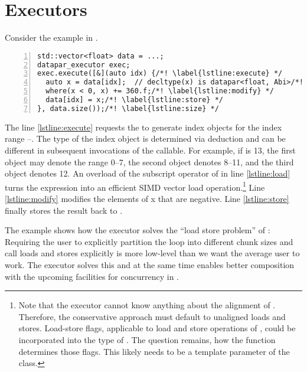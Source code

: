 \section{Executors}

Consider the example in .
\begin{lstlisting}[style=Vc,numbers=left,float,label=lst:executor example,caption={
  Example use of the \type{datapar_executor}.
}]
std::vector<float> data = ...;
datapar_executor exec;
exec.execute([&](auto idx) {/*! \label{lstline:execute} */
  auto x = data[idx];  // decltype(x) is datapar<float, Abi>/*! \label{lstline:load} */
  where(x < 0, x) += 360.f;/*! \label{lstline:modify} */
  data[idx] = x;/*! \label{lstline:store} */
}, data.size());/*! \label{lstline:size} */
\end{lstlisting}
The line \ref{lstline:execute} requests the  to generate index objects for the index range --.
The type of the index object is determined via deduction and can be different in subsequent invocations of the callable.
For example, if  is 13, the first  object may denote the range 0--7, the second  object denotes 8--11, and the third  object denotes 12.
An overload of the subscript operator of \std{} in line \ref{lstline:load} turns the expression into an efficient SIMD vector load operation.\footnote{
  Note that the executor cannot know anything about the alignment of .
  Therefore, the conservative approach must default to unaligned loads and stores.
  Load-store flags, applicable to load and store operations of \datapar, could be incorporated into the type of .
  The question remains, how the  function determines those flags.
  This likely needs to be a template parameter of the  class.
}
Line \ref{lstline:modify} modifies the elements of \code x that are negative.
Line \ref{lstline:store} finally stores the result back to .

The example shows how the executor solves the “load store problem” of \datapar: Requiring the user to explicitly partition the loop into different chunk sizes and call loads and stores explicitly is more low-level than we want the average user to work.
The executor solves this and at the same time enables better composition with the upcoming facilities for concurrency in \CC{}.

